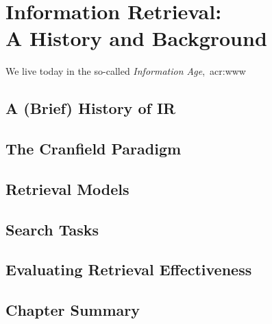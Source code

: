 
\chapter[Information Retrieval]{Information Retrieval:\\A History and Background}\label{chap:ir_background}
We live today in the so-called \emph{Information Age},~\gls{acr:www}

\section{A (Brief) History of IR}

\section{The Cranfield Paradigm}

\section{Retrieval Models}

\section{Search Tasks}

\section{Evaluating Retrieval Effectiveness}

\section{Chapter Summary}
